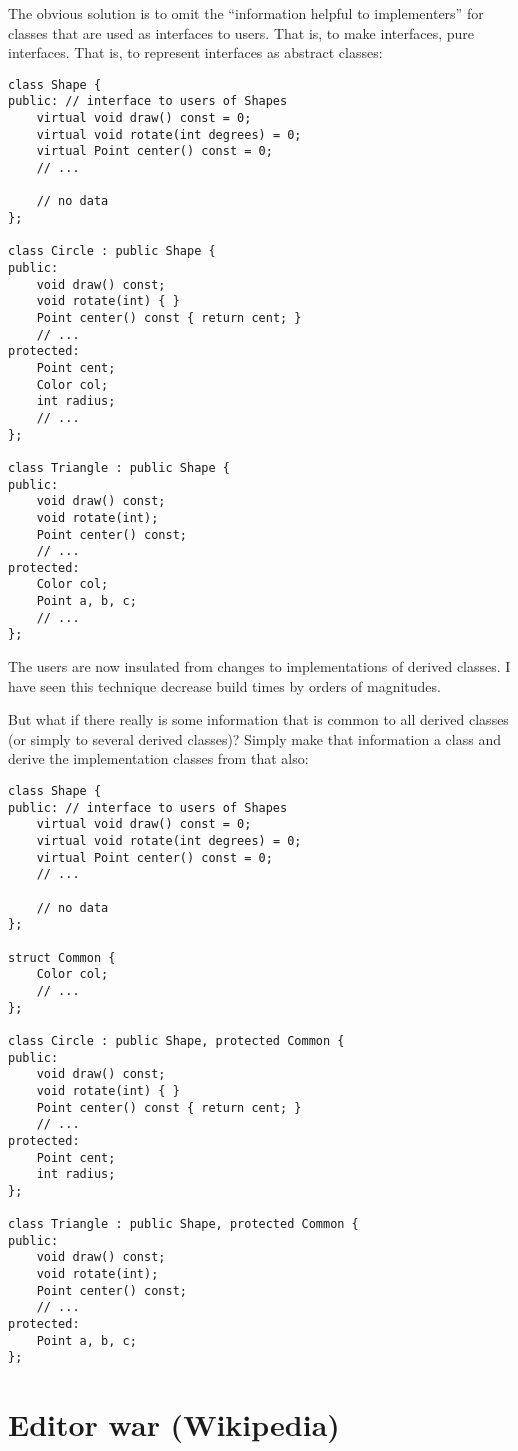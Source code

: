 \documentclass[10pt,twoside,openright]{memoir}
\begin{document}
The obvious solution is to omit the ``information helpful to implementers'' for classes that are used as interfaces to users. That is, to make interfaces, pure interfaces. That is, to represent interfaces as abstract classes:

{\footnotesize
\begin{verbatim}
class Shape {
public: // interface to users of Shapes
    virtual void draw() const = 0;
    virtual void rotate(int degrees) = 0;
    virtual Point center() const = 0;
    // ...

    // no data
};

class Circle : public Shape {
public:    
    void draw() const;
    void rotate(int) { }
    Point center() const { return cent; }
    // ...
protected:
    Point cent;
    Color col;
    int radius;
    // ...
};

class Triangle : public Shape {
public:    
    void draw() const;
    void rotate(int);
    Point center() const;
    // ...
protected:
    Color col;
    Point a, b, c;
    // ...
};    
\end{verbatim}
}

\noindent The users are now insulated from changes to implementations of derived classes. I have seen this technique decrease build times by orders of magnitudes.

But what if there really is some information that is common to all derived classes (or simply to several derived classes)? Simply make that information a class and derive the implementation classes from that also:

{\footnotesize
\begin{verbatim}
class Shape {
public: // interface to users of Shapes
    virtual void draw() const = 0;
    virtual void rotate(int degrees) = 0;
    virtual Point center() const = 0;
    // ...

    // no data
};

struct Common {
    Color col;
    // ...
};
        
class Circle : public Shape, protected Common {
public:    
    void draw() const;
    void rotate(int) { }
    Point center() const { return cent; }
    // ...
protected:
    Point cent;
    int radius;
};

class Triangle : public Shape, protected Common {
public:    
    void draw() const;
    void rotate(int);
    Point center() const;
    // ...
protected:
    Point a, b, c;
};    
\end{verbatim}
}


\chapter{Editor war (Wikipedia)}
\end{document}
